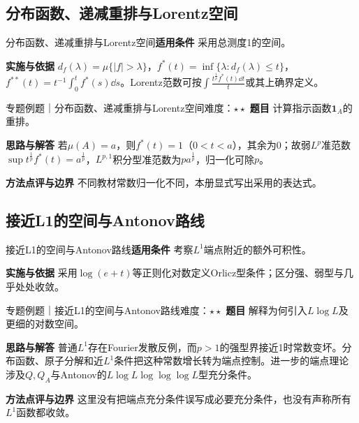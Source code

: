 \subsection{分布函数、递减重排与Lorentz空间}\label{mat:fourier_advanced:rearrangement}
\begin{method}{分布函数、递减重排与Lorentz空间}\textbf{适用条件} 采用总测度1的空间。\par\textbf{实施与依据} $d_f(\lambda)=\mu\{|f|>\lambda\}$，$f^*(t)=\inf\{\lambda:d_f(\lambda)\le t\}$，$f^{**}(t)=t^{-1}\int_0^tf^*(s)\dd s$。Lorentz范数可按$\int \frac{t^{\frac{1}{p}}f^*(t)\dd t}{t}$或其上确界定义。\end{method}
\begin{example}{专题例题｜分布函数、递减重排与Lorentz空间}{难度：$\star\star$}
\textbf{题目} 计算指示函数$\mathbf1_A$的重排。\par\textbf{思路与解答} 若$\mu(A)=a$，则$f^*(t)=1$（$0<t<a$），其余为0；故弱$L^p$准范数$\sup t^{\frac{1}{p}}f^*(t)=a^{\frac{1}{p}}$，$L^{p,1}$积分型准范数为$p a^{\frac{1}{p}}$，归一化可除$p$。\par\textbf{方法点评与边界} 不同教材常数归一化不同，本册显式写出采用的表达式。
\end{example}
\subsection{接近L1的空间与Antonov路线}\label{mat:fourier_advanced:endpoint}
\begin{method}{接近L1的空间与Antonov路线}\textbf{适用条件} 考察$L^1$端点附近的额外可积性。\par\textbf{实施与依据} 采用$\log(e+t)$等正则化对数定义Orlicz型条件；区分强、弱型与几乎处处收敛。\end{method}
\begin{example}{专题例题｜接近L1的空间与Antonov路线}{难度：$\star\star$}
\textbf{题目} 解释为何引入$L\log L$及更细的对数空间。\par\textbf{思路与解答} 普通$L^1$存在Fourier发散反例，而$p>1$的强型界接近1时常数变坏。分布函数、原子分解和近$L^1$条件把这种常数增长转为端点控制。进一步的端点理论涉及$Q,Q_A$与Antonov的$L\log L\log\log\log L$型充分条件。\par\textbf{方法点评与边界} 这里没有把端点充分条件误写成必要充分条件，也没有声称所有$L^1$函数都收敛。
\end{example}
